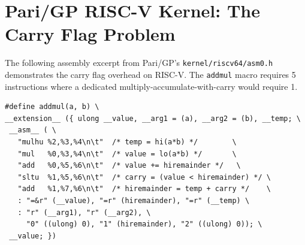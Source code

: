 \documentclass[11pt,a4paper]{article}
\begin{document}
\section{Pari/GP RISC-V Kernel: The Carry Flag Problem}
\label{app:carry-problem}

The following assembly excerpt from Pari/GP's
\texttt{kernel/riscv64/asm0.h} demonstrates the carry flag overhead on
RISC-V.  The \texttt{addmul} macro requires 5 instructions where a
dedicated multiply-accumulate-with-carry would require 1.

\begin{lstlisting}[style=asm,caption={Pari/GP \texttt{addmul} for RISC-V (from \texttt{asm0.h}).  Five instructions emulate what the KR CFU achieves in one.},label=lst:parigp-addmul]
#define addmul(a, b) \
__extension__ ({ ulong __value, __arg1 = (a), __arg2 = (b), __temp; \
 __asm__ ( \
   "mulhu %2,%3,%4\n\t"  /* temp = hi(a*b) */        \
   "mul   %0,%3,%4\n\t"  /* value = lo(a*b) */       \
   "add   %0,%5,%6\n\t"  /* value += hiremainder */   \
   "sltu  %1,%5,%6\n\t"  /* carry = (value < hiremainder) */ \
   "add   %1,%7,%6\n\t"  /* hiremainder = temp + carry */    \
   : "=&r" (__value), "=r" (hiremainder), "=r" (__temp) \
   : "r" (__arg1), "r" (__arg2), \
     "0" ((ulong) 0), "1" (hiremainder), "2" ((ulong) 0)); \
 __value; })
\end{lstlisting}
\end{document}
